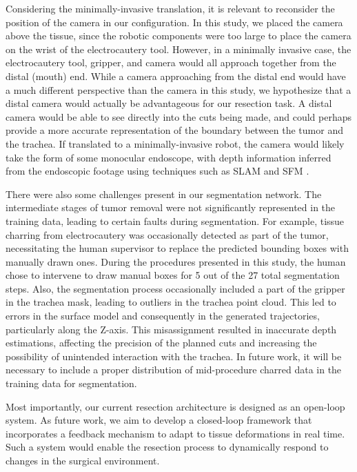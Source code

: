 Considering the minimally-invasive translation, it is relevant to reconsider the position of the camera in our configuration. In this study, we placed the camera above the tissue, since the robotic components were too large to place the camera on the wrist of the electrocautery tool. However, in a minimally invasive case, the electrocautery tool, gripper, and camera would all approach together from the distal (mouth) end. While a camera approaching from the distal end would have a much different perspective than the camera in this study, we hypothesize that a distal camera would actually be advantageous for our resection task. A distal camera would be able to see directly into the cuts being made, and could perhaps provide a more accurate representation of the boundary between the tumor and the trachea. If translated to a minimally-invasive robot, the camera would likely take the form of some monocular endoscope, with depth information inferred from the endoscopic footage using techniques such as SLAM and SFM \cite{Masoumian2022, Liu2022}.


There were also some challenges present in our segmentation network. The intermediate stages of tumor removal were not significantly represented in the training data, leading to certain faults during segmentation. For example, tissue charring from electrocautery was occasionally detected as part of the tumor, necessitating the human supervisor to replace the predicted bounding boxes with manually drawn ones. During the procedures presented in this study, the human chose to intervene to draw manual boxes for 5 out of the 27 total segmentation steps. Also, the segmentation process occasionally included a part of the gripper in the trachea mask, leading to outliers in the trachea point cloud. This led to errors in the surface model and consequently in the generated trajectories, particularly along the Z-axis. This misassignment resulted in inaccurate depth estimations, affecting the precision of the planned cuts and increasing the possibility of unintended interaction with the trachea. In future work, it will be necessary to include a proper distribution of mid-procedure charred data in the training data for segmentation.


Most importantly, our current resection architecture is designed as an open-loop system. As future work, we aim to develop a closed-loop framework that incorporates a feedback mechanism to adapt to tissue deformations in real time. Such a system would enable the resection process to dynamically respond to changes in the surgical environment. 

